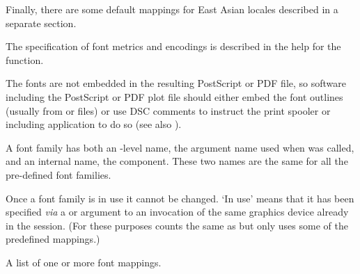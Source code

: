 \begin{Details}
Finally, there are some default mappings for East Asian locales
described in a separate section.

The specification of font metrics and encodings is described in the help
for the  function.

The fonts are not embedded in the resulting PostScript or PDF file, so
software including the PostScript or PDF plot file should either embed
the font outlines (usually from  or  files) or
use DSC comments to instruct the print spooler or including
application to do so (see also ).

A font family has both an \R{}-level name, the argument name used when
 was called, and an internal name, the
 component.  These two names are the same for all the
pre-defined font families.

Once a font family is in use it cannot be changed.  `In use'
means that it has been specified \emph{via} a  or
 argument to an invocation of the same graphics device
already in the \R{} session.  (For these purposes  counts the
same as  but only uses some of the predefined mappings.)
\end{Details}
%
\begin{Value}
A list of one or more font mappings.
\end{Value}
%
